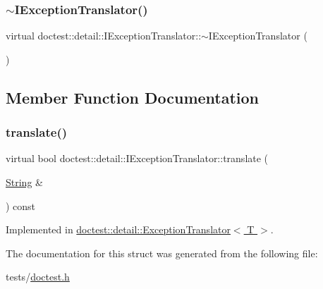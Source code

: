 \mbox{\label{structdoctest_1_1detail_1_1IExceptionTranslator_a9031aa45964213709841eba4b3e19d48}} 
\subsubsection{\texorpdfstring{$\sim$\+I\+Exception\+Translator()}{~IExceptionTranslator()}}
{\footnotesize\ttfamily virtual doctest\+::detail\+::\+I\+Exception\+Translator\+::$\sim$\+I\+Exception\+Translator (\begin{DoxyParamCaption}{ }\end{DoxyParamCaption})\hspace{0.3cm}{\ttfamily [virtual]}}



\subsection{Member Function Documentation}
\mbox{\label{structdoctest_1_1detail_1_1IExceptionTranslator_a9c56005e4c83c13b859cc2e31102bfbc}} 
\subsubsection{\texorpdfstring{translate()}{translate()}}
{\footnotesize\ttfamily virtual bool doctest\+::detail\+::\+I\+Exception\+Translator\+::translate (\begin{DoxyParamCaption}\item[{\hyperlink{classdoctest_1_1String}{String} \&}]{ }\end{DoxyParamCaption}) const\hspace{0.3cm}{\ttfamily [pure virtual]}}



Implemented in \hyperlink{classdoctest_1_1detail_1_1ExceptionTranslator_a56484c4218a06bbbd1548335a8b64110}{doctest\+::detail\+::\+Exception\+Translator$<$ T $>$}.



The documentation for this struct was generated from the following file\+:\begin{DoxyCompactItemize}
\item 
tests/\hyperlink{doctest_8h}{doctest.\+h}\end{DoxyCompactItemize}
